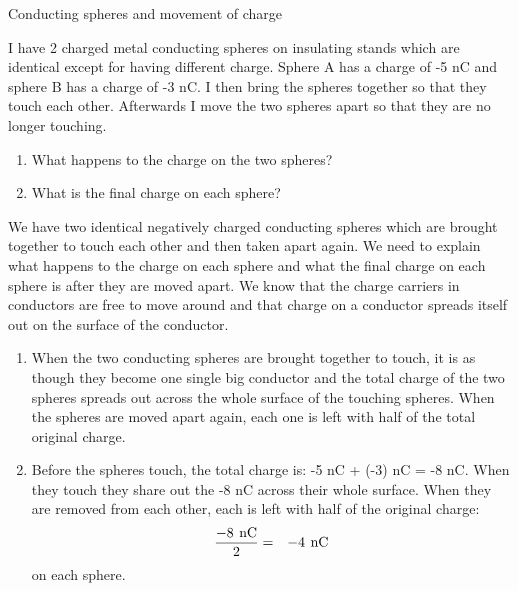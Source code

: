 \begin{wex}{Conducting spheres and movement of charge}{I have 2 charged metal conducting spheres on insulating stands which are identical except for having different charge. Sphere A has a charge of -5 nC and sphere B has a charge of -3 nC. I then bring the spheres together so that they touch each other. Afterwards I move the two spheres apart so that they are no longer touching.
      \begin{enumerate}[noitemsep, label=\textbf{\arabic*}. ] 
       \item What happens to the charge on the two spheres?
	\item What is the final charge on each sphere?
\end{enumerate}}{
      \label{m38781*id201406}We have two identical negatively charged conducting spheres which are brought together to touch each other and then taken apart again. We need to explain what happens to the charge on each sphere and what the final charge on each sphere is after they are moved apart.
      \label{m38781*id201416}We know that the charge carriers in conductors are free to move around and that charge on a conductor spreads itself out on the surface of the conductor. 
      \label{m38781*id201425}\begin{enumerate}[noitemsep, label=\textbf{\alph*}. ] 
            \leftskip=20pt\rightskip=\leftskip\label{m38781*uid9}\item When the two conducting spheres are brought together to touch, it is as though they become one single big conductor and the total charge of the two spheres spreads out across the whole surface of the touching spheres. When the spheres are moved apart again, each one is left with half of the total original charge.
\label{m38781*uid10}\item Before the spheres touch, the total charge is: -5 nC + (-3) nC = -8 nC. When they touch they share out the -8 nC across their whole surface. When they are removed from each other, each is left with half of the original charge:
\label{m38781*id201455}\nopagebreak\noindent{}
    \begin{eqnarray*}
    \frac{-8\phantom{\rule{4pt}{0ex}}\text{nC}}{2}& =& -4\phantom{\rule{4pt}{0ex}}\text{nC}
      \end{eqnarray*}
on each sphere.
\end{enumerate}}
\end{wex}

